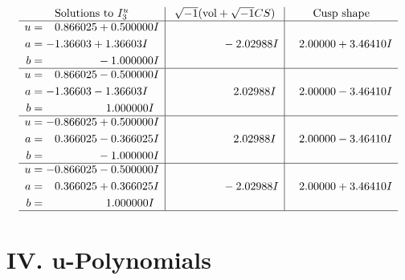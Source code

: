 \documentclass[1p]{elsarticle_modified}
\theoremstyle{definition}
\newcommand{\I}{\sqrt{-1}}
\begin{document}
$$\begin{array}{c|c|c}  
\text{Solutions to }I^u_{3}& \I (\text{vol} + \sqrt{-1}CS) & \text{Cusp shape}\\
 \hline 
\begin{aligned}
u &= \phantom{-}0.866025 + 0.500000 I \\
a &= -1.36603 + 1.36603 I \\
b &= \phantom{-0.000000 } -1.000000 I\end{aligned}
 & \phantom{-0.000000 } -2.02988 I & \phantom{-}2.00000 + 3.46410 I \\ \hline\begin{aligned}
u &= \phantom{-}0.866025 - 0.500000 I \\
a &= -1.36603 - 1.36603 I \\
b &= \phantom{-0.000000 -}1.000000 I\end{aligned}
 & \phantom{-0.000000 -}2.02988 I & \phantom{-}2.00000 - 3.46410 I \\ \hline\begin{aligned}
u &= -0.866025 + 0.500000 I \\
a &= \phantom{-}0.366025 - 0.366025 I \\
b &= \phantom{-0.000000 } -1.000000 I\end{aligned}
 & \phantom{-0.000000 -}2.02988 I & \phantom{-}2.00000 - 3.46410 I \\ \hline\begin{aligned}
u &= -0.866025 - 0.500000 I \\
a &= \phantom{-}0.366025 + 0.366025 I \\
b &= \phantom{-0.000000 -}1.000000 I\end{aligned}
 & \phantom{-0.000000 } -2.02988 I & \phantom{-}2.00000 + 3.46410 I\\
 \hline 
 \end{array}$$\newpage
\newpage\renewcommand{\arraystretch}{1}
\centering \section*{ IV. u-Polynomials}
\end{document}
